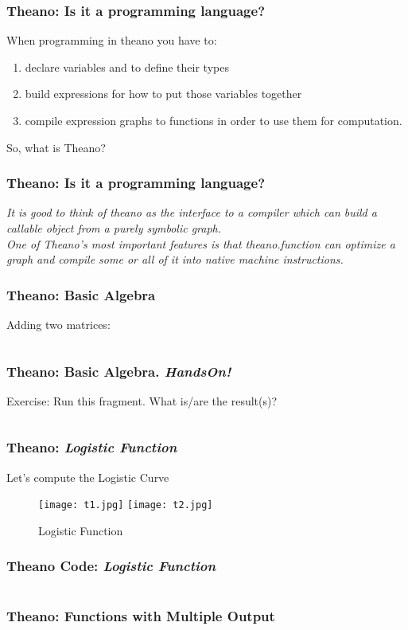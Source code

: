 \documentclass[aspectratio=169]{beamer}
\begin{document}
\begin{frame}
\frametitle{Theano: Is it a programming language?}
When programming in theano you have to:
\begin{enumerate}
\item  declare variables and to define their types
\item  build expressions for how to put those variables together
\item  compile expression graphs to functions in order to use them for computation.
\end{enumerate}
So, what is Theano?
\end{frame}

\begin{frame}
\frametitle{Theano: Is it a programming language?}
\emph{It is good to think of theano as the interface to a compiler which can build a callable object from a purely symbolic graph. 
\\[1.0cm]
One of Theano’s most important features is that theano.function can optimize a graph and compile some or all of it into native machine instructions. }
\end{frame}

\begin{frame}
\frametitle{Theano: Basic Algebra}
Adding two matrices:
\inputminted{python}{t5.py}
\end{frame}

\begin{frame}
\frametitle{Theano: Basic Algebra. \textit{HandsOn!} }
Exercise: Run this fragment. What is/are the result(s)?  
\\[0.5cm]
\inputminted{python}{t6.py}
\end{frame}

\begin{frame}
\frametitle{Theano: \textit{Logistic Function} }
Let's compute the Logistic Curve
\begin{figure}
\texttt{[image: t1.jpg]}
\texttt{[image: t2.jpg]}
\caption{Logistic Function}
\label{fig:Logistic Function}
\end{figure}
\end{frame}

\begin{frame}
\frametitle{Theano Code: \emph{Logistic Function} }
\inputminted{python}{t7.py}
\end{frame}

\begin{frame}
\frametitle{Theano: Functions with Multiple Output}
\inputminted{python}{t8.py}
\end{frame}
\end{document}
